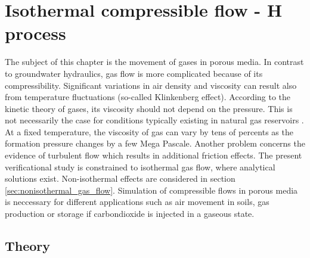 \section{Isothermal compressible flow - H process}
\label{sec:h_gas}

The subject of this chapter is the movement of gases in porous media. In contrast to groundwater hydraulics, gas flow is more
complicated because of its compressibility. Significant variations
in air density and viscosity can result also from temperature
fluctuations (so-called Klinkenberg effect). According to the
kinetic theory of gases, its viscosity should not depend on the
pressure. This is not necessarily the case for conditions
typically existing in natural gas reservoirs \cite{VoiLau:1985}. At a fixed
temperature, the viscosity of gas can vary by tens of percents as
the formation pressure changes by a few Mega Pascale. Another
problem concerns the evidence of turbulent flow which results in
additional friction effects. The present verificational study is constrained to isothermal gas flow, where
analytical solutions exist. Non-isothermal effects are considered in section \ref{sec:nonisothermal_gas_flow}.
%
Simulation of compressible flows in porous media is neccessary for different applications such as air movement in soils, gas production or  storage if carbondioxide is injected in a gaseous state.

\subsection{Theory}
\label{sec:air_flow}

